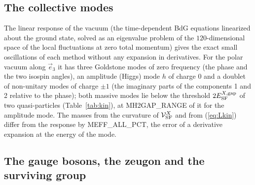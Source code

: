 \documentclass[aps,prd,onecolumn,superscriptaddress,nofootinbib,floatfix,longbibliography]{revtex4-2}
\newcommand{\SF}{{\rm SF}}
\begin{document}
\subsection{The collective modes}

The linear response of the vacuum (the time-dependent BdG equations linearized about the ground state, solved as an
eigenvalue problem of the $120$-dimensional space of the local fluctuations at zero total momentum) gives the exact small
oscillations of each method without any expansion in derivatives. For the polar vacuum along $\vec e_3$ it has three Goldstone
modes of zero frequency (the phase and the two isospin angles), an amplitude (Higgs) mode $h$ of charge 0 and a doublet of
non-unitary modes of charge $\pm1$ (the imaginary parts of the components 1 and 2 relative to the phase); both massive modes lie
below the threshold $2E^{X,{\rm gap}}_\SF$ of two quasi-particles (Table~\ref{tab:kin}), at {{MH2GAP_RANGE}} of it for the amplitude
mode. The masses from the curvature of $\mathcal V^X_\SF$ and from (\ref{eq:Lkin}) differ from the response by {{MEFF_ALL_PCT}}, the error
of a derivative expansion at the energy of the mode.

\subsection{The gauge bosons, the zeugon and the surviving group}
\label{sec:mass}
\end{document}
